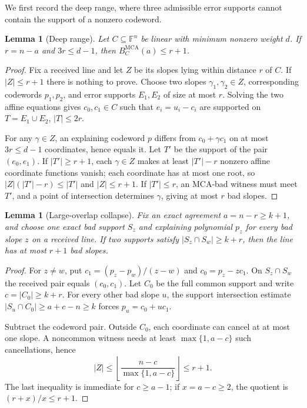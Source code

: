 \documentclass[11pt,a4paper]{amsart}
\numberwithin{equation}{section}
\newtheorem{lemma}[theorem]{Lemma}
\theoremstyle{remark}
\DeclareMathOperator{\MCA}{MCA}
\newcommand{\F}{\mathbb F}
\newcommand{\abs}[1]{\lvert#1\rvert}
\newcommand{\floor}[1]{\left\lfloor#1\right\rfloor}
\begin{document}
We first record the deep range, where three admissible error supports cannot contain the support of a nonzero codeword.

\begin{lemma}[Deep range]\label{lem:deep}
Let $C\subseteq\F^n$ be linear with minimum nonzero weight $d$.  If $r=n-a$ and $3r\le d-1$, then $B_C^{\MCA}(a)\le r+1$.
\end{lemma}

\begin{proof}
Fix a received line and let $Z$ be its slopes lying within distance $r$ of $C$.  If $\abs Z\le r+1$ there is nothing to prove.  Choose two slopes $\gamma_1,\gamma_2\in Z$, corresponding codewords $p_1,p_2$, and error supports $E_1,E_2$ of size at most $r$.  Solving the two affine equations gives $c_0,c_1\in C$ such that $e_i=u_i-c_i$ are supported on $T=E_1\cup E_2$, $\abs T\le2r$.

For any $\gamma\in Z$, an explaining codeword $p$ differs from $c_0+\gamma c_1$ on at most $3r\le d-1$ coordinates, hence equals it.  Let $T'$ be the support of the pair $(e_0,e_1)$.  If $\abs{T'}\ge r+1$, each $\gamma\in Z$ makes at least $\abs{T'}-r$ nonzero affine coordinate functions vanish; each coordinate has at most one root, so $\abs Z(\abs{T'}-r)\le\abs{T'}$ and $\abs Z\le r+1$.  If $\abs{T'}\le r$, an MCA-bad witness must meet $T'$, and a point of intersection determines $\gamma$, giving at most $r$ bad slopes.
\end{proof}

\begin{lemma}[Large-overlap collapse]\label{lem:overlap-collapse}
Fix an exact agreement $a=n-r\ge k+1$, and choose one exact bad support $S_z$ and explaining polynomial $p_z$ for every bad slope $z$ on a received line.  If two supports satisfy $\abs{S_z\cap S_w}\ge k+r$, then the line has at most $r+1$ bad slopes.
\end{lemma}

\begin{proof}
For $z\ne w$, put $c_1=(p_z-p_w)/(z-w)$ and $c_0=p_z-zc_1$.  On $S_z\cap S_w$ the received pair equals $(c_0,c_1)$.  Let $C_0$ be the full common support and write $c=\abs{C_0}\ge k+r$.  For every other bad slope $u$, the support intersection estimate $\abs{S_u\cap C_0}\ge a+c-n\ge k$ forces $p_u=c_0+uc_1$.

Subtract the codeword pair.  Outside $C_0$, each coordinate can cancel at at most one slope.  A noncommon witness needs at least $\max\{1,a-c\}$ such cancellations, hence
\[
 \abs Z\le \floor{\frac{n-c}{\max\{1,a-c\}}}\le r+1.
\]
The last inequality is immediate for $c\ge a-1$; if $x=a-c\ge2$, the quotient is $(r+x)/x\le r+1$.
\end{proof}
\end{document}
